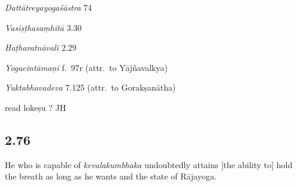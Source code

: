\begin{ekdosis}
\begin{sources}[hp02_075]
\emph{Dattātreyayogaśāstra} 74

\begin{versinnote}
\end{versinnote}

\emph{Vasiṣṭhasaṃhitā} 3.30

\begin{versinnote}
\end{versinnote}
\end{sources}

\begin{testimonia}[hp02_075]
\emph{Haṭharatnāvalī} 2.29

\begin{versinnote}
\end{versinnote}

\emph{Yogacintāmaṇi} f.~97r (attr.~to Yājñavalkya)

\begin{versinnote}
\end{versinnote}

\emph{Yuktabhavadeva} 7.125 (attr.~to Gorakṣanātha)

\begin{versinnote}
    read  lokeṣu ? JH
\end{versinnote}

\end{testimonia}

\subsection*{2.76}
\begin{translation}[hp02_076]
He who is capable of \emph{kevalakumbhaka} undoubtedly attains [the ability to] hold the breath as long as he wants and the state of Rājayoga.
\end{translation}


\end{ekdosis}
